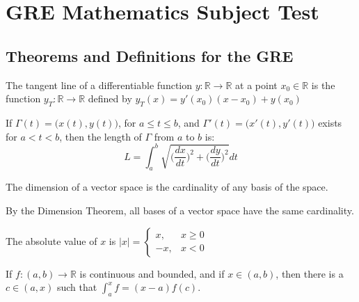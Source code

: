 \documentclass[crop=false,class=book]{standalone}
\begin{document}
\chapter{GRE Mathematics Subject Test}
    \section{Theorems and Definitions for the GRE}
        \begin{definition*}
            The tangent line of a differentiable function
            $y:\mathbb{R}\rightarrow\mathbb{R}$ at a point
            $x_{0}\in\mathbb{R}$ is the function
            $y_{T}:\mathbb{R}\rightarrow\mathbb{R}$ defined by
            $y_{T}(x)=y'(x_0)(x-x_0)+y(x_0)$ 
        \end{definition*}
        \begin{definition*}
            If $\Gamma(t)=\big(x(t),y(t)\big)$, for $a\leq t\leq b$,
            and $\Gamma'(t)=\big(x'(t),y'(t)\big)$ exists for
            $a<t<b$, then the length of $\Gamma$ from $a$ to $b$ is:
            \begin{equation}
                L=\int_{a}^{b}\sqrt{
                    \bigg(\frac{dx}{dt}\bigg)^{2}+
                    \bigg(\frac{dy}{dt}\bigg)^{2}
                }dt
            \end{equation}
        \end{definition*}
        \begin{definition*}
            The dimension of a vector space is the cardinality of
            any basis of the space. 
        \end{definition*}
        \begin{remark*}
            By the Dimension Theorem, all bases of a vector space
            have the same cardinality.
        \end{remark*}
        \begin{definition*}
            The absolute value of $x$ is
            $|x|=\begin{cases}%
                x,&x\geq 0\\ 
                -x,&x<0
            \end{cases}$
        \end{definition*}
        \begin{theorem*}
            If $f:(a,b)\rightarrow\mathbb{R}$ is continuous and
            bounded, and if $x\in(a,b)$, then there is a $c\in(a,x)$
            such that $\int_{a}^{x}f=(x-a)f(c)$.
        \end{theorem*}
\end{document}
